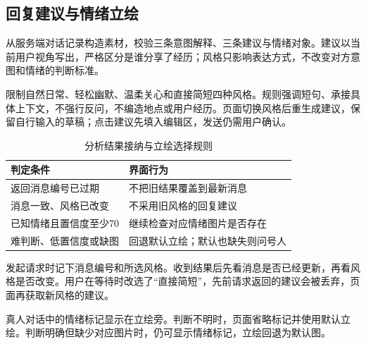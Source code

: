 \subsection*{回复建议与情绪立绘}
从服务端对话记录构造素材，校验三条意图解释、三条建议与情绪对象。建议以当前用户视角写出，严格区分是谁分享了经历；风格只影响表达方式，不改变对方意图和情绪的判断标准。

限制自然日常、轻松幽默、温柔关心和直接简短四种风格。规则强调短句、承接具体上下文，不强行反问，不编造地点或用户经历。页面切换风格后重生成建议，保留自行输入的草稿；点击建议先填入编辑区，发送仍需用户确认。

\begin{table}[H]\centering\small
\caption{分析结果接纳与立绘选择规则}
\begin{tabularx}{\linewidth}{@{}p{37mm}X@{}}\toprule
判定条件 & 界面行为 \\ \midrule
返回消息编号已过期 & 不把旧结果覆盖到最新消息 \\
消息一致、风格已改变 & 不采用旧风格的回复建议 \\
已知情绪且置信度至少70 & 继续检查对应情绪图片是否存在 \\
难判断、低置信度或缺图 & 回退默认立绘；默认也缺失则问号人 \\ \bottomrule
\end{tabularx}\end{table}

发起请求时记下消息编号和所选风格。收到结果后先看消息是否已经更新，再看风格是否改变。用户在等待时改选了“直接简短”，先前请求返回的建议会被丢弃，页面再获取新风格的建议。

真人对话中的情绪标记显示在立绘旁。判断不明时，页面省略标记并使用默认立绘。判断明确但缺少对应图片时，仍可显示情绪标记，立绘回退为默认图。
